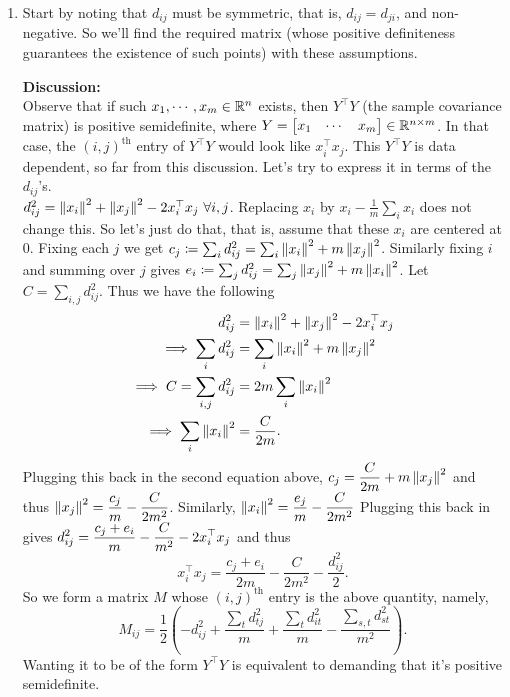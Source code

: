 \soln
\begin{enumerate}[leftmargin=*]
\item Start by noting that $d_{ij}$ must be symmetric, that is, $d_{ij}=d_{ji}$, and non-negative. So we'll find the required matrix (whose positive definiteness guarantees the existence of such points) with these assumptions. 

\textbf{Discussion:}\\
Observe that if such $x_{1},\cdots, x_{m}\in\mathbb{R}^{n}$ exists, then $Y^{\top}Y$ (the sample covariance matrix) is positive semidefinite, where $Y = \begin{bmatrix}x_{1}&\cdots&x_{m}\end{bmatrix}\in\mathbb{R}^{n\times m}$. In that case, the $(i,j)^{\text{th}}$ entry of $Y^{\top}Y$ would look like $x_{i}^{\top}x_{j}$. This $Y^{\top}Y$ is data dependent, so far from this discussion. Let's try to express it in terms of the $d_{ij}$'s. \\
$d_{ij}^{2} = \left\lVert x_{i} \right\rVert_{}^{2} + \left\lVert x_{j} \right\rVert_{}^{2} - 2x_{i}^{\top}x_{j}~\forall i,j$. Replacing $x_{i}$ by $x_{i}-\frac{1}{m}\sum_{i}x_{i}$ does not change this. So let's just do that, that is, assume that these $x_{i}$ are centered at $0$. Fixing each $j$ we get $c_{j}\coloneqq\sum_{i}d_{ij}^{2} = \sum_{i} \left\lVert x_{i} \right\rVert_{}^{2} + m\left\lVert x_{j} \right\rVert_{}^{2}$. Similarly fixing $i$ and summing over $j$ gives $e_{i} \coloneqq \sum_{j}d_{ij}^{2}  = \sum_{j} \left\lVert x_{j} \right\rVert_{}^{2} + m\left\lVert x_{i} \right\rVert_{}^{2}  $. Let $C = \sum_{i,j}d_{ij}^{2}$. Thus we have the following 
\begin{align*}
d_{ij}^{2} &= \left\lVert x_{i} \right\rVert_{}^{2} + \left\lVert x_{j} \right\rVert_{}^{2} - 2x_{i}^{\top}x_{j}\\
\implies \sum_{i}d_{ij}^{2} &= \sum_{i}\left\lVert x_{i} \right\rVert_{}^{2} + m\left\lVert x_{j} \right\rVert_{}^{2} \\
\implies C = \sum_{i,j}d_{ij}^{2} &= 2m\sum_{i}\left\lVert x_{i} \right\rVert_{}^{2} \\
\implies \sum_{i}\left\lVert x_{i} \right\rVert_{}^{2} &= \frac{C}{2m}.
\end{align*}
Plugging this back in the second equation above, $\displaystyle c_{j} = \frac{C}{2m} + m\left\lVert x_{j} \right\rVert_{}^{2}$ and thus $\displaystyle \left\lVert x_{j} \right\rVert_{}^{2} = \frac{c_{j}}{m} - \frac{C}{2m^{2}}$. Similarly, $\displaystyle \left\lVert x_{i} \right\rVert_{}^{2} = \frac{e_{j}}{m} - \frac{C}{2m^{2}}$ Plugging this back in gives $\displaystyle d_{ij}^{2} = \frac{c_{j}+e_{i}}{m} - \frac{C}{m^{2}}-2x_{i}^{\top}x_{j}$ and thus $$x_{i}^{\top}x_{j} = \frac{c_{j}+e_{i}}{2m} - \frac{C}{2m^{2}} - \frac{d_{ij}^{2}}{2}.$$ 
So we form a matrix $M$ whose $(i,j)^{\text{th}}$ entry is the above quantity, namely, $$\boxed{M_{ij}=\frac{1}{2}\left(-d_{ij}^{2} + \frac{\sum_{t}d_{tj}^{2}}{m} + \frac{\sum_{t}d_{it}^{2}}{m} - \frac{\sum_{s,t}d_{st}^{2}}{m^{2}}\right)}.$$ Wanting it to be of the form $Y^{\top}Y$ is equivalent to demanding that it's positive semidefinite.
\\


\end{enumerate}
